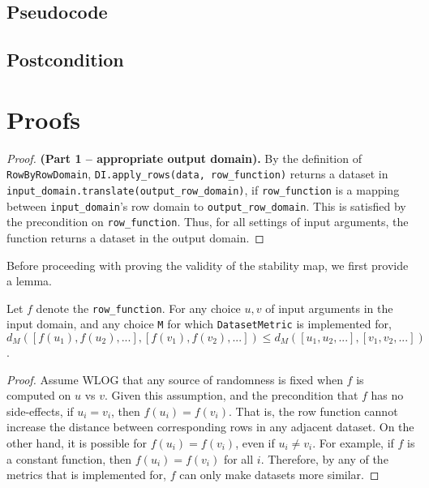 \documentclass{article}
\begin{document}
\subsection*{Pseudocode}


\subsection*{Postcondition}

\section{Proofs}

\begin{proof} \textbf{(Part 1 -- appropriate output domain).}
    By the definition of \texttt{RowByRowDomain}, \texttt{DI.apply\_rows(data, row\_function)} returns a dataset in \texttt{input\_domain.translate(output\_row\_domain)},
    if \texttt{row\_function} is a mapping between \texttt{input\_domain}'s row domain to \texttt{output\_row\_domain}.
    This is satisfied by the precondition on \texttt{row\_function}.
    Thus, for all settings of input arguments, the function returns a dataset in the output domain.
\end{proof}

Before proceeding with proving the validity of the stability map, we first provide a lemma.

\begin{lemma}
    \label{f-sim}
    Let $f$ denote the \texttt{row\_function}. 
    For any choice $u, v$ of input arguments in the input domain, and any choice \texttt{M} for which \texttt{DatasetMetric} is implemented for,
    $d_{M}([f(u_1), f(u_2), ...], [f(v_1), f(v_2), ...]) \le d_{M}([u_1, u_2, ...], [v_1, v_2, ...])$.
\end{lemma}

\begin{proof}
    Assume WLOG that any source of randomness is fixed when $f$ is computed on $u$ vs $v$.
    Given this assumption, and the precondition that $f$ has no side-effects,
    if $u_i = v_i$, then $f(u_i) = f(v_i)$. 
    That is, the row function cannot increase the distance between corresponding rows in any adjacent dataset.
    On the other hand, it is possible for $f(u_i) = f(v_i)$, even if $u_i \neq v_i$.
    For example, if $f$ is a constant function, then $f(u_i) = f(v_i)$ for all $i$.
    Therefore, by any of the metrics that  is implemented for,
    $f$ can only make datasets more similar.
\end{proof}
\end{document}
